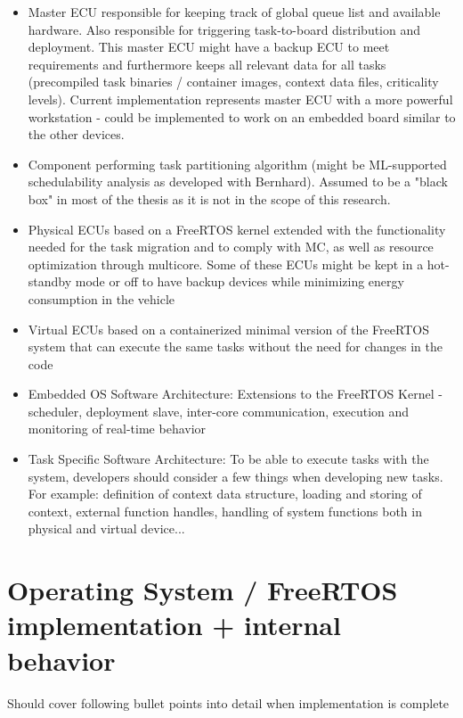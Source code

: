 \begin{itemize}
	\item Master ECU responsible for keeping track of global queue list and available hardware. Also responsible for triggering task-to-board distribution and deployment. This master ECU might have a backup ECU to meet requirements and furthermore keeps all relevant data for all tasks (precompiled task binaries / container images, context data files, criticality levels). Current implementation represents master ECU with a more powerful workstation - could be implemented to work on an embedded board similar to the other devices.
	\item Component performing task partitioning algorithm (might be ML-supported schedulability analysis as developed with Bernhard). Assumed to be a "black box" in most of the thesis as it is not in the scope of this research.
	\item Physical ECUs based on a FreeRTOS kernel extended with the functionality needed for the task migration and to comply with MC, as well as resource optimization through multicore. Some of these ECUs might be kept in a hot-standby mode or off to have backup devices while minimizing energy consumption in the vehicle
	\item Virtual ECUs based on a containerized minimal version of the FreeRTOS system that can execute the same tasks without the need for changes in the code
	\item Embedded OS Software Architecture: Extensions to the FreeRTOS Kernel - scheduler, deployment slave, inter-core communication, execution and monitoring of real-time behavior
	\item Task Specific Software Architecture: To be able to execute tasks with the system, developers should consider a few things when developing new tasks. For example: definition of context data structure, loading and storing of context, external function handles, handling of system functions both in physical and virtual device...
\end{itemize}

\section{Operating System / FreeRTOS implementation + internal behavior}
Should cover following bullet points into detail when implementation is complete

